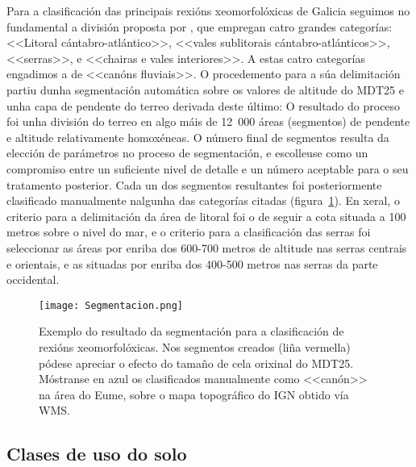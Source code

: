 \documentclass[11pt,a4paper]{article}
\begin{document}
Para a clasificación das principais rexións xeomorfolóxicas de Galicia seguimos no fundamental a división proposta por \citet{Ramil2005}, que empregan catro grandes categorías: <<Litoral cántabro-atlántico>>, <<vales sublitorais cántabro-atlánticos>>, <<serras>>, e <<chairas e vales interiores>>. A estas catro categorías engadimos a de <<canóns fluviais>>.
O procedemento para a súa delimitación partiu dunha segmentación automática sobre os valores de altitude do MDT25 e unha capa de pendente do terreo derivada deste último: O resultado do proceso foi unha división do terreo en algo máis de 12~000 áreas (segmentos) de pendente e altitude relativamente homoxéneas. O número final de segmentos resulta da elección de parámetros no proceso de segmentación, e escolleuse como un compromiso entre un suficiente nivel de detalle e un número aceptable para o seu tratamento posterior. Cada un dos segmentos resultantes foi posteriormente clasificado manualmente nalgunha das categorías citadas (figura~\ref{fig:Morfo}). En xeral, o criterio para a delimitación da área de litoral foi o de seguir a cota situada a 100 metros sobre o nivel do mar, e o criterio para a clasificación das serras foi seleccionar as áreas por enriba dos 600-700 metros de altitude \citep{PerezAlberti1986} nas serras centrais e orientais, e as situadas por enriba dos 400-500 metros nas serras da parte occidental.


\begin{figure}
\caption{Exemplo do resultado da segmentación para a clasificación de rexións xeomorfolóxicas. Nos segmentos creados (liña vermella) pódese apreciar o efecto do tamaño de cela orixinal do MDT25. Móstranse en azul os clasificados manualmente como <<canón>> na área do Eume, sobre o mapa topográfico do IGN obtido vía WMS.}\label{fig:Morfo}
\texttt{[image: Segmentacion.png]}
\end{figure}

\subsection{Clases de uso do solo}
\end{document}
